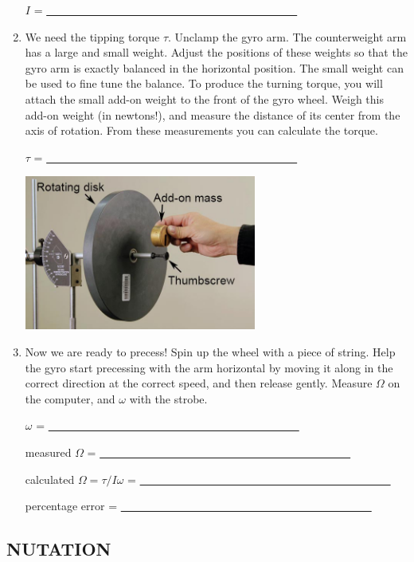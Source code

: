 \begin{enumerate}[label=\arabic*.]
\(I\) = \ul{~~~~~~~~~~~~~~~~~~~~~~~~~~~~~~~~~~~~~~~~~~~~~}

\item We need the tipping torque \(\tau\).  Unclamp the gyro arm.  The counterweight arm has a large and small weight.  Adjust the positions of these weights so that the gyro arm is exactly balanced in the horizontal position.  The small weight can be used to fine tune the balance.  To produce the turning torque, you will attach the small add-on weight to the front of the gyro wheel.  Weigh this add-on weight (in newtons!), and measure the distance of its center from the axis of rotation.  From these measurements you can calculate the torque.

\(\tau\) = \ul{~~~~~~~~~~~~~~~~~~~~~~~~~~~~~~~~~~~~~~~~~~~~~}
\begin{center} \includegraphics*[width=0.6\textwidth]{imgs/6labs/6Alab/6Aexp7/6A-EXP7-fig6_text_pdf.jpg} \end{center}

\item Now we are ready to precess!  Spin up the wheel with a piece of string.  Help the gyro start precessing with the arm horizontal by moving it along in the correct direction at the correct speed, and then release gently.  Measure \(\Omega\) on the computer, and \(\omega\) with the strobe.

\(\omega\) = \ul{~~~~~~~~~~~~~~~~~~~~~~~~~~~~~~~~~~~~~~~~~~~~~}

measured \(\Omega\) = \ul{~~~~~~~~~~~~~~~~~~~~~~~~~~~~~~~~~~~~~~~~~~~~~}

calculated \(\Omega = \tau/I\omega\) = \ul{~~~~~~~~~~~~~~~~~~~~~~~~~~~~~~~~~~~~~~~~~~~~~}

percentage error = \ul{~~~~~~~~~~~~~~~~~~~~~~~~~~~~~~~~~~~~~~~~~~~~~}

\end{enumerate}

\subsection*{NUTATION}

